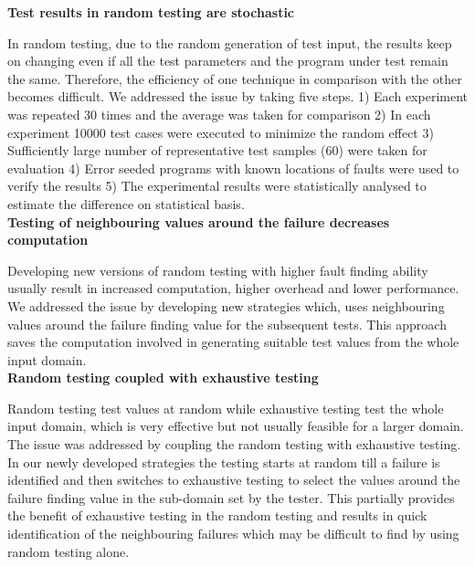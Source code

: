 \textbf{Test results in random testing are stochastic} 

In random testing, due to the random generation of test input, the results keep on changing even if all the test parameters and the program under test remain the same. Therefore, the efficiency of one technique in comparison with the other becomes difficult. We addressed  the issue by taking five steps. 1) Each experiment was repeated 30 times and the average was taken for comparison 2) In each experiment 10000 test cases were executed to minimize the random effect 3) Sufficiently large number of representative test samples (60) were taken for evaluation 4) Error seeded programs with known locations of faults were used to verify the results 5) The experimental results were statistically analysed to estimate the difference on statistical basis.\\


   
\textbf{Testing of neighbouring values around the failure decreases computation}

Developing new versions of random testing with higher fault finding ability usually result in increased computation, higher overhead and lower performance. We addressed the issue by developing new strategies which, uses neighbouring values around the failure finding value for the subsequent tests. This approach saves the computation involved in generating suitable test values from the whole input domain. \\

\textbf{Random testing coupled with exhaustive testing}

Random testing test values at random while exhaustive testing test the whole input domain, which is very effective but not usually feasible for a larger domain. The issue was addressed by coupling the random testing with exhaustive testing. In our newly developed strategies the testing starts at random till a failure is identified and then switches to exhaustive testing to select the values around the failure finding value in the sub-domain set by the tester. This partially provides the benefit of exhaustive testing in the random testing and results in quick identification of the neighbouring failures which may be difficult to find by using random testing alone.\\


